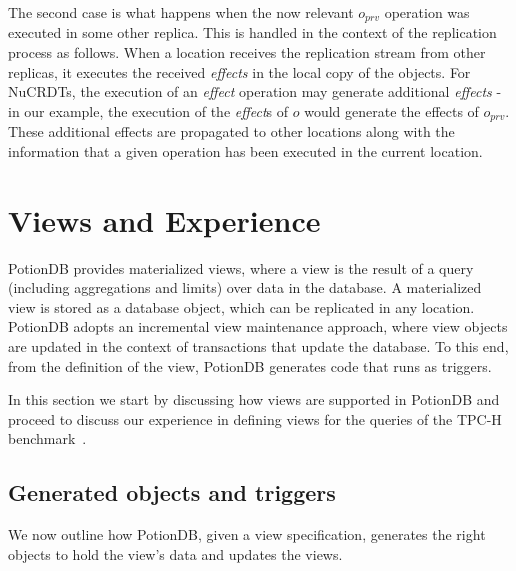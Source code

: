 \documentclass[sigplan,review,anonymous]{acmart}
\begin{document}
The second case is what happens when the now relevant $o_{prv}$ operation was executed in some 
other replica.  This is handled in the context of the replication process as follows.  When a location receives
the replication stream from other replicas, it executes the received \emph{effects} in the local copy
of the objects.  For NuCRDTs, the execution of an \emph{effect} operation may generate additional 
\emph{effects} - in our example, the execution of the \emph{effect}s of $o$ would generate
the effects of $o_{prv}$. These additional effects are propagated to other locations along with the 
information that a given operation has been executed in the current location. 

\section{Views and Experience}
\label{sec:views_for_apps}

PotionDB provides materialized views, where a view is the result of a query (including aggregations and limits)
over data in the database.  A materialized view is stored as a database object, which can be replicated
in any location.
PotionDB adopts an incremental view maintenance approach, where 
view objects are updated in the context of transactions that update the database. 
To this end, from the definition of the view, PotionDB generates code that runs as triggers.

In this section we start by discussing how views are supported in PotionDB and proceed to 
discuss %
our experience in defining views for the queries of the TPC-H benchmark~\cite{tpch}. 

\subsection{Generated objects and triggers}
\label{subsec:generated_view}

We now outline how PotionDB, given a view specification, generates the right objects to hold the view's data and updates the views.
\end{document}
